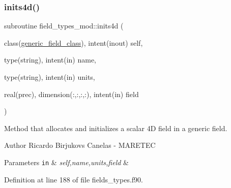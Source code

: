 \subsubsection{\texorpdfstring{inits4d()}{inits4d()}}
{\footnotesize\ttfamily subroutine field\+\_\+types\+\_\+mod\+::inits4d (\begin{DoxyParamCaption}\item[{class(\mbox{\hyperlink{structfield__types__mod_1_1generic__field__class}{generic\+\_\+field\+\_\+class}}), intent(inout)}]{self,  }\item[{type(string), intent(in)}]{name,  }\item[{type(string), intent(in)}]{units,  }\item[{real(prec), dimension(\+:,\+:,\+:,\+:), intent(in)}]{field }\end{DoxyParamCaption})\hspace{0.3cm}{\ttfamily [private]}}



Method that allocates and initializes a scalar 4D field in a generic field. 

\begin{DoxyAuthor}{Author}
Ricardo Birjukovs Canelas -\/ M\+A\+R\+E\+T\+EC 
\end{DoxyAuthor}

\begin{DoxyParams}[1]{Parameters}
\mbox{\tt in}  & {\em self,name,units,field} & \\
\hline
\end{DoxyParams}


Definition at line 188 of file fields\+\_\+types.\+f90.



